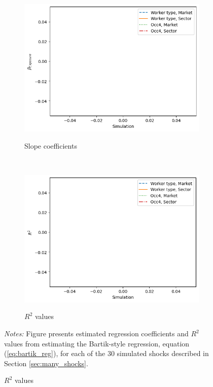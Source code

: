 \documentclass[12pt]{article}
\theoremstyle{definition}
\theoremstyle{plain}
\begin{document}
\begin{figure}[htbp]
	\centering
	\caption{Exposure coefficients from all simulated shocks}
	\begin{subfigure}{\textwidth}
		\centering
		\caption{Slope coefficients}
		\includegraphics[width=.7\textwidth]{../Results/fake_data_all_sector_shocks_coef.png} %
		\label{fig:fake_data_all_sector_shocks_coef}
	\end{subfigure}\\
 	\vfill
 	\vspace{1em}
	\begin{subfigure}{\textwidth}
		\centering
		\caption{$R^2$ values}
		\includegraphics[width=.7\textwidth]{../Results/fake_data_all_sector_shocks_r2.png} %
		\label{fig:fake_data_all_sector_shocks_r2}
	\end{subfigure}
	\label{fig:fake_data_all_sector_shocks}
	\footnotesize\flushleft \emph{Notes:} Figure presents estimated regression coefficients and $R^2$ values from estimating the Bartik-style regression, equation (\ref{eq:bartik_reg}), for each of the 30 simulated shocks described in Section \ref{sec:many_shocks}.  
\end{figure}
\end{document}
